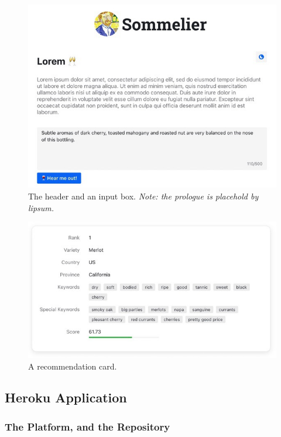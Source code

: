 \documentclass[
]{kaohandt}
\begin{document}
\begin{figure}[h]
	\includegraphics[]{sommelier-view-03.jpg}
	\caption{The header and an input box. \emph{Note: the prologue is placehold by lipsum.}}
	\label{fig:app_input}
\end{figure}

\begin{figure}[h]
	\includegraphics[]{sommelier-view-04.jpg}
	\caption{A recommendation card.}
	\label{fig:app_rec_card}
\end{figure}

\subsection*{Heroku Application}

\subsubsection*{The Platform, and the Repository}
\end{document}
